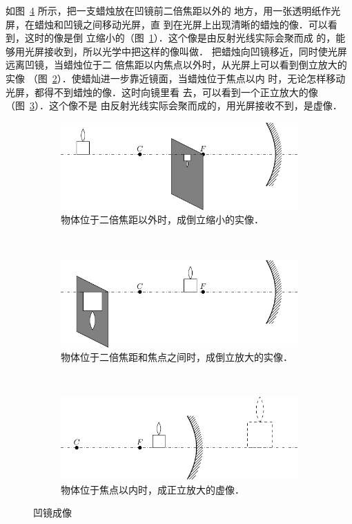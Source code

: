 如图~\ref{fig_C_5-16} 所示，把一支蜡烛放在凹镜前二倍焦距以外的
地方，用一张透明纸作光屏，在蜡烛和凹镜之间移动光屏，直
到在光屏上出现清晰的蜡烛的像．可以看到，这时的像是倒
立缩小的（图~\ref{fig_C_5-16a}）．这个像是由反射光线实际会聚而成
的，能够用光屏接收到，所以光学中把这样的像叫做．
把蜡烛向凹镜移近，同时使光屏远离凹镜，当蜡烛位于二
倍焦距以内焦点以外时，从光屏上可以看到倒立放大的实像
（图~\ref{fig_C_5-16b}）．使蜡灿进一步靠近镜面，当蜡烛位于焦点以内
时，无论怎样移动光屏，都得不到蜡烛的像．这时向镜里看
去，可以看到一个正立放大的像（图~\ref{fig_C_5-16c}）．这个像不是
由反射光线实际会聚而成的，用光屏接收不到，是虚像．
\begin{figure}[htbp]
	\centering
	\begin{subfigure}{0.9\linewidth}
		\centering
		\includegraphics{fig/C/5-16a.pdf}
		\caption{物体位于二倍焦距以外时，成倒立缩小的实像．}\label{fig_C_5-16a}
	\end{subfigure}
	\\
	\begin{subfigure}{0.9\linewidth}
		\centering
		\includegraphics{fig/C/5-16b.pdf}
		\caption{物体位于二倍焦距和焦点之间时，成倒立放大的实像．}\label{fig_C_5-16b}
	\end{subfigure}
	\\
	\begin{subfigure}{0.9\linewidth}
		\centering
		\includegraphics{fig/C/5-16c.pdf}
		\caption{物体位于焦点以内时，成正立放大的虚像．}\label{fig_C_5-16c}
	\end{subfigure}
	\caption{凹镜成像}\label{fig_C_5-16}
\end{figure}



